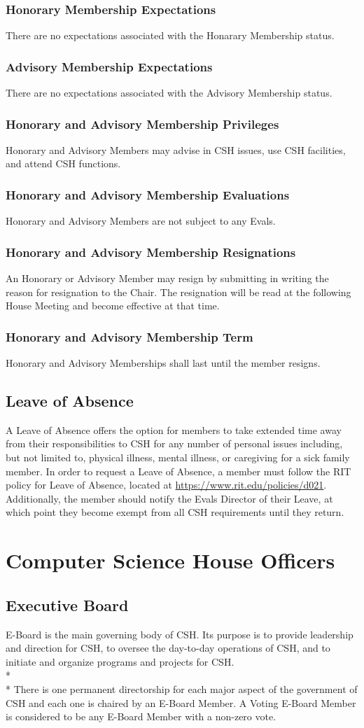 \documentclass{article}
\newcommand{\article}[1]{\section{#1} \label{#1}}
\newcommand{\asection}[1]{\subsection{#1} \label{#1}}
\newcommand{\asubsection}[1]{\subsubsection{#1} \label{#1}}
\begin{document}
\asubsection{Honorary Membership Expectations}
There are no expectations associated with the Honarary Membership status.

\asubsection{Advisory Membership Expectations}
There are no expectations associated with the Advisory Membership status.

\asubsection{Honorary and Advisory Membership Privileges}
Honorary and Advisory Members may advise in CSH issues, use CSH facilities, and attend CSH functions.

\asubsection{Honorary and Advisory Membership Evaluations}
Honorary and Advisory Members are not subject to any Evals.

\asubsection{Honorary and Advisory Membership Resignations}
An Honorary or Advisory Member may resign by submitting in writing the reason for resignation to the Chair.
The resignation will be read at the following House Meeting and become effective at that time.

\asubsection{Honorary and Advisory Membership Term}
Honorary and Advisory Memberships shall last until the member resigns.

\asection{Leave of Absence}
A Leave of Absence offers the option for members to take extended time away from their responsibilities to CSH for any number of personal issues including, but not limited to, physical illness, mental illness, or caregiving for a sick family member.
In order to request a Leave of Absence, a member must follow the RIT policy for Leave of Absence, located at \url{https://www.rit.edu/policies/d021}. Additionally, the member should notify the Evals Director of their Leave, at which point they become exempt from all CSH requirements until they return.

\article{Computer Science House Officers}

\asection{Executive Board}
E-Board is the main governing body of CSH.
Its purpose is to provide leadership and direction for CSH, to oversee the day-to-day operations of CSH, and to initiate and organize programs and projects for CSH.
\\*\\*
There is one permanent directorship for each major aspect of the government of CSH and each one is chaired by an E-Board Member.
A Voting E-Board Member is considered to be any E-Board Member with a non-zero vote. %
\end{document}
